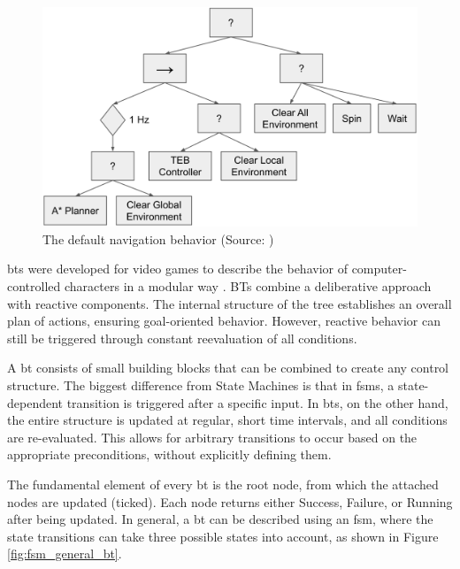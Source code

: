 \begin{figure}[h]
    \centering
    \includegraphics[width=\textwidth]{figures/02_state_of_the_art/nav2_bt.png}
    \caption{The default navigation behavior (Source: \cite{Marathon})}
    \label{fig:nav2_bt}
\end{figure}

\Glspl{bt} were developed for video games to describe the behavior of computer-controlled characters in a modular way \cite{Limetal.,2010}. BTs combine a deliberative approach with reactive components. The internal structure of the tree establishes an overall plan of actions, ensuring goal-oriented behavior. However, reactive behavior can still be triggered through constant reevaluation of all conditions. 

A \gls{bt} consists of small building blocks that can be combined to create any control structure. The biggest difference from State Machines is that in \glspl{fsm}, a state-dependent transition is triggered after a specific input. In \glspl{bt}, on the other hand, the entire structure is updated at regular, short time intervals, and all conditions are re-evaluated. This allows for arbitrary transitions to occur based on the appropriate preconditions, without explicitly defining them.

The fundamental element of every \gls{bt} is the root node, from which the attached nodes are updated (ticked). Each node returns either Success, Failure, or Running after being updated. In general, a \gls{bt} can be described using an \gls{fsm}, where the state transitions can take three possible states into account, as shown in Figure \ref{fig:fsm_general_bt}.

